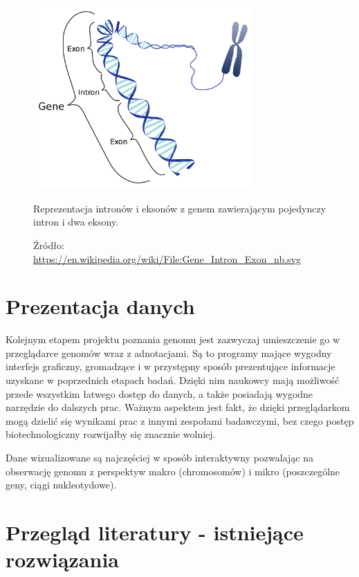 \begin{figure}[h]
	\centering
	\includegraphics[width=0.75\textwidth]{img/intron-exon.png}
	\caption{Reprezentacja intronów i eksonów z genem zawierającym pojedynczy intron i dwa eksony.}
	\vspace{-0.5cm}
	\caption*{\scriptsize Źródło: \url{https://en.wikipedia.org/wiki/File:Gene\_Intron\_Exon\_nb.svg}}
	\label{img:intron-exon}
\end{figure}


\section{Prezentacja danych}
Kolejnym etapem projektu poznania genomu jest zazwyczaj umieszczenie go w przeglądarce genomów wraz z adnotacjami. Są to programy mające wygodny interfejs graficzny, gromadzące i w przystępny sposób prezentujące informacje uzyskane w poprzednich etapach badań. Dzięki nim naukowcy mają możliwość przede wszystkim łatwego dostęp do danych, a także posiadają wygodne narzędzie do dalszych prac. 
Ważnym aspektem jest fakt, że dzięki przeglądarkom mogą dzielić się wynikami prac z innymi zespołami badawczymi, bez czego postęp biotechnologiczny rozwijałby się znacznie wolniej.

Dane wizualizowane są najczęściej w sposób interaktywny pozwalając na obserwację genomu z perspektyw makro (chromosomów) i mikro (poszczególne geny, ciągi nukleotydowe).


\section{Przegląd literatury - istniejące rozwiązania}

